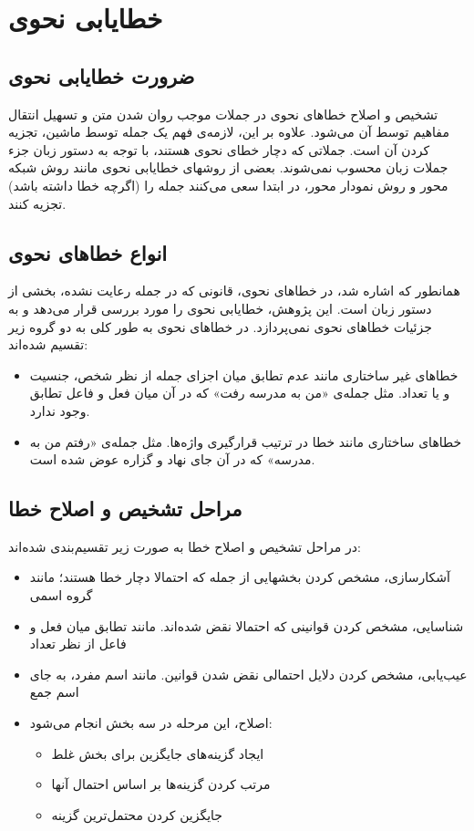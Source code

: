 \documentclass{report}
\begin{document}
\section{خطایابی نحوی}
\subsection{ضرورت خطایابی نحوی}
تشخیص و اصلاح خطاهای نحوی در جملات موجب روان شدن متن و تسهیل انتقال مفاهیم توسط آن می‌شود. علاوه بر این، لازمه‌ی فهم یک جمله توسط ماشین، تجزیه کردن آن است. جملاتی که دچار خطای نحوی هستند، با توجه به دستور زبان جزء جملات زبان محسوب نمی‌شوند. بعضی از روشهای خطایابی نحوی مانند روش شبکه محور و روش نمودار محور، در ابتدا سعی می‌کنند جمله را (اگرچه خطا داشته باشد) تجزیه کنند.

\subsection{انواع خطاهای نحوی}
همانطور که اشاره شد، در خطاهای نحوی، قانونی که در جمله رعایت نشده، بخشی از دستور زبان است. این پژوهش، خطایابی نحوی را مورد بررسی قرار می‌دهد و به جزئیات خطاهای نحوی نمی‌پردازد. در \cite{ct3} خطاهای نحوی به طور کلی به دو گروه زیر تقسیم شده‌اند:
\begin{itemize}
\item
خطاهای غیر ساختاری مانند عدم تطابق میان اجزای جمله از نظر شخص، جنسیت و یا تعداد. مثل جمله‌ی «من به مدرسه رفت» که در آن میان فعل و فاعل تطابق وجود ندارد.
\item
خطاهای ساختاری مانند خطا در ترتیب قرارگیری واژه‌ها. مثل جمله‌ی «رفتم من به مدرسه» که در آن جای نهاد و گزاره عوض شده است.
\end{itemize}

\subsection{مراحل تشخیص و اصلاح خطا}
در \cite{ct6} مراحل تشخیص و اصلاح خطا به صورت زیر تقسیم‌بندی شده‌اند:
\begin{itemize}
\item
آشکار‌سازی، مشخص کردن بخشهایی از جمله که احتمالا دچار خطا هستند؛ مانند گروه اسمی
\item
شناسایی، مشخص کردن قوانینی که احتمالا نقض شده‌اند. مانند تطابق میان فعل و فاعل از نظر تعداد
\item
عیب‌یابی، مشخص کردن دلایل احتمالی نقض شدن قوانین. مانند اسم مفرد، به جای اسم جمع
\item
اصلاح، این مرحله در سه بخش انجام می‌شود:
\begin{itemize}
\item
ایجاد گزینه‌های جایگزین برای بخش غلط
\item
مرتب کردن گزینه‌ها بر اساس احتمال آنها
\item
جایگزین کردن محتمل‌ترین گزینه
\end{itemize}
\end{itemize}
\end{document}
